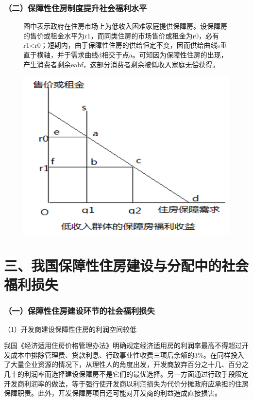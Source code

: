 \documentclass[aspectratio=169, 12pt]{beamer}
\begin{document}
\begin{frame}[plain]
    \frametitle{（二）保障性住房制度提升社会福利水平}
    \begin{figure}[]
        \centering
        \begin{minipage}{0.4\linewidth}
            图中表示政府在住房市场上为低收入困难家庭提供保障房。设保障房的售价或租金水平为r1，而同类住房的市场售价或租金为r0，必有r1<r0；短期内，由于保障性住房的供给恒定不变，因而供给曲线s垂直于横轴，并于需求曲线d相交于点a。可知因为保障性住房的出现，产生消费者剩余eabf，这部分消费者剩余被低收入家庭无偿获得。
        \end{minipage}%
        \begin{minipage}{0.6\linewidth}
            \centering
            \includegraphics[width=1.0\textwidth]{./resources/figure/renthouse.png}
        \end{minipage}
        \end{figure}
\end{frame}

\section{三、我国保障性住房建设与分配中的社会福利损失}

\begin{frame}[plain]
    \frametitle{（一）保障性住房建设环节的社会福利损失}
    （1）开发商建设保障性住房的利润空间较低 \par
    我国《经济适用住房价格管理办法》明确规定经济适用房的利润率最高不得超过开发成本中排除管理费、贷款利息、行政事业性收费三项后余额的3\%。在同样投入了大量企业资源的情况下，从理性人的角度出发，开发商放弃百分之十几、百分之几十的利润率而选择建设保障房不是它们的最优选择。另一方面通过行政手段限定开发商利润率的做法，等于强行使开发商以利润损失为代价分摊政府应承担的住房保障职责。此外，开发保障房项目还可能对开发商的利益造成直接损害。
\end{frame}
\end{document}
